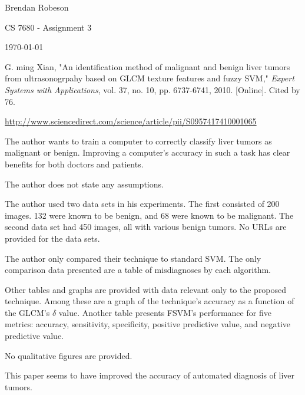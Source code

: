 \documentclass[11pt]{article}
\begin{document}
\noindent Brendan Robeson

\noindent CS 7680 - Assignment 3

\noindent \today

\medskip

\begin{description}[leftmargin=0in]
    \item [Source] G. ming Xian, "An identification method of malignant and
        benign liver tumors from ultrasonogrpahy based on GLCM texture features
        and fuzzy SVM," \emph{Expert Systems with Applications}, vol. 37, no.
        10, pp. 6737-6741, 2010. [Online]. Cited by 76.

    \item [URL]
        \url{http://www.sciencedirect.com/science/article/pii/S0957417410001065}

    \item [Problem] The author wants to train a computer to correctly classify
        liver tumors as malignant or benign. Improving a computer's accuracy in
        such a task has clear benefits for both doctors and patients.

    \item [Assumptions] The author does not state any assumptions.

    \item [Data Sets] The author used two data sets in his experiments. The
        first consisted of 200 images. 132 were known to be benign, and 68 were
        known to be malignant. The second data set had 450 images, all with
        various benign tumors. No URLs are provided for the data sets. 

    \item [Algorithm Overview]

    \item [Experiments] The author only compared their technique to standard
        SVM. The only comparison data presented are a table of misdiagnoses by
        each algorithm.

        Other tables and graphs are provided with data relevant only to the
        proposed technique. Among these are a graph of the technique's accuracy
        as a function of the GLCM's $\delta$ value. Another table presents
        FSVM's performance for five metrics: accuracy, sensitivity, specificity,
        positive predictive value, and negative predictive value.

        No qualitative figures are provided.

    \item [Contributions] This paper seems to have improved the accuracy of
        automated diagnosis of liver tumors.


\end{description}
\end{document}
